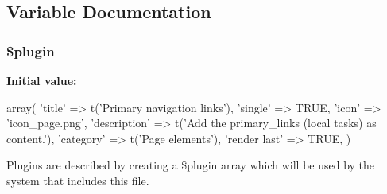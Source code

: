 \subsection{Variable Documentation}
\hypertarget{page__primary__links_8inc_ada8a7130088351710bb02ed622d6bf65}{
\subsubsection[{\$plugin}]{\setlength{\rightskip}{0pt plus 5cm}\$plugin}}
\label{page__primary__links_8inc_ada8a7130088351710bb02ed622d6bf65}
{\bfseries Initial value:}
\begin{DoxyCode}
 array(
  'title' => t('Primary navigation links'),
  'single' => TRUE,
  'icon' => 'icon_page.png',
  'description' => t('Add the primary_links (local tasks) as content.'),
  'category' => t('Page elements'),
  'render last' => TRUE,
)
\end{DoxyCode}
Plugins are described by creating a \$plugin array which will be used by the system that includes this file. 